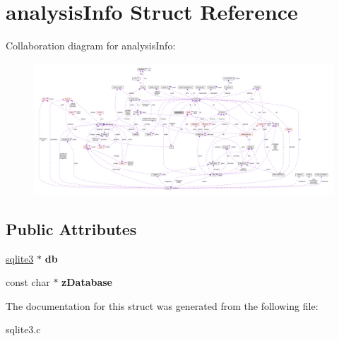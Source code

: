 \hypertarget{structanalysisInfo}{}\section{analysis\+Info Struct Reference}
\label{structanalysisInfo}


Collaboration diagram for analysis\+Info\+:\nopagebreak
\begin{figure}[H]
\begin{center}
\leavevmode
\includegraphics[width=350pt]{structanalysisInfo__coll__graph}
\end{center}
\end{figure}
\subsection*{Public Attributes}
\begin{DoxyCompactItemize}
\item 
\hyperlink{structsqlite3}{sqlite3} $\ast$ {\bfseries db}\hypertarget{structanalysisInfo_a13108eadc55ffe73a8825fb91cc0f9b5}{}\label{structanalysisInfo_a13108eadc55ffe73a8825fb91cc0f9b5}

\item 
const char $\ast$ {\bfseries z\+Database}\hypertarget{structanalysisInfo_accbe3c1f5613ffa13b9578e58a5d850a}{}\label{structanalysisInfo_accbe3c1f5613ffa13b9578e58a5d850a}

\end{DoxyCompactItemize}


The documentation for this struct was generated from the following file\+:\begin{DoxyCompactItemize}
\item 
sqlite3.\+c\end{DoxyCompactItemize}
